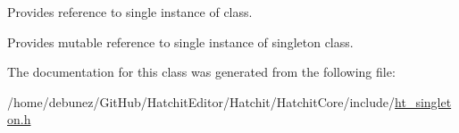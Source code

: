 Provides reference to single instance of class. 

Provides mutable reference to single instance of singleton class. 

The documentation for this class was generated from the following file\+:\begin{DoxyCompactItemize}
\item 
/home/debunez/\+Git\+Hub/\+Hatchit\+Editor/\+Hatchit/\+Hatchit\+Core/include/\hyperlink{ht__singleton_8h}{ht\+\_\+singleton.\+h}\end{DoxyCompactItemize}
